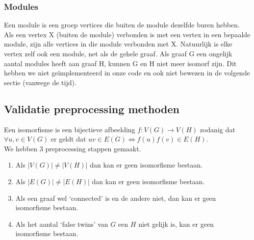 \documentclass{article}
\begin{document}
\subsubsection{Modules}
Een module is een groep vertices die buiten de module dezelfde buren hebben. Als een vertex X (buiten de module) verbonden is met een vertex in een bepaalde module, zijn alle vertices in die module verbonden met X. Natuurlijk is elke vertex zelf ook een module, net als de gehele graaf. Als graaf G een ongelijk aantal modules heeft aan graaf H, kunnen G en H niet meer isomorf zijn. Dit hebben we niet ge\"implementeerd in onze code en ook niet bewezen in de volgende sectie (vanwege de tijd).

\subsection{Validatie preprocessing methoden}

Een isomorfisme is een bijectieve afbeelding $f:V(G) \rightarrow V(H)$ zodanig dat $\forall u,v \in V(G)$ er geldt dat $uv \in E(G) \Leftrightarrow f(u)f(v)\in E(H)$.\\

We hebben 3 preprocessing stappen gemaakt.
\begin{enumerate}
\item Als $|V(G)|\neq|V(H)|$ dan kan er geen isomorfisme bestaan.
\item Als $|E(G)|\neq|E(H)|$ dan kan er geen isomorfisme bestaan.
\item Als een graaf wel `connected' is en de andere niet, dan kan er geen isomorfisme bestaan.
\item Als het aantal `false twins' van $G$ een $H$ niet gelijk is, kan er geen isomorfisme bestaan.
\end{enumerate}
\end{document}

